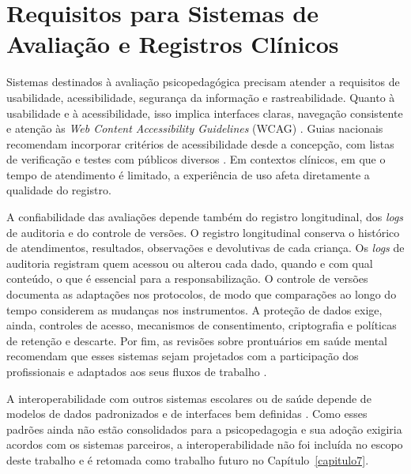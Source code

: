 \section{Requisitos para Sistemas de Avaliação e Registros Clínicos}

Sistemas destinados à avaliação psicopedagógica precisam atender a requisitos de usabilidade, acessibilidade, segurança da informação e rastreabilidade. Quanto à usabilidade e à acessibilidade, isso implica interfaces claras, navegação consistente e atenção às \textit{Web Content Accessibility Guidelines} (WCAG) \cite{w3c_wcag22_pt}. Guias nacionais recomendam incorporar critérios de acessibilidade desde a concepção, com listas de verificação e testes com públicos diversos \cite{govbr_guia_acessibilidade}. Em contextos clínicos, em que o tempo de atendimento é limitado, a experiência de uso afeta diretamente a qualidade do registro.

A confiabilidade das avaliações depende também do registro longitudinal, dos \textit{logs} de auditoria e do controle de versões. O registro longitudinal conserva o histórico de atendimentos, resultados, observações e devolutivas de cada criança. Os \textit{logs} de auditoria registram quem acessou ou alterou cada dado, quando e com qual conteúdo, o que é essencial para a responsabilização. O controle de versões documenta as adaptações nos protocolos, de modo que comparações ao longo do tempo considerem as mudanças nos instrumentos. A proteção de dados exige, ainda, controles de acesso, mecanismos de consentimento, criptografia e políticas de retenção e descarte. Por fim, as revisões sobre prontuários em saúde mental recomendam que esses sistemas sejam projetados com a participação dos profissionais e adaptados aos seus fluxos de trabalho \cite{zurynski2021_emr_saude_mental}.

A interoperabilidade com outros sistemas escolares ou de saúde depende de modelos de dados padronizados e de interfaces bem definidas \cite{Lins_Ferreira_Nutels_Junior_Tenorio_Filho_2024, mota2024_rnds_interoperabilidade}. Como esses padrões ainda não estão consolidados para a psicopedagogia e sua adoção exigiria acordos com os sistemas parceiros, a interoperabilidade não foi incluída no escopo deste trabalho e é retomada como trabalho futuro no Capítulo~\ref{capitulo7}.